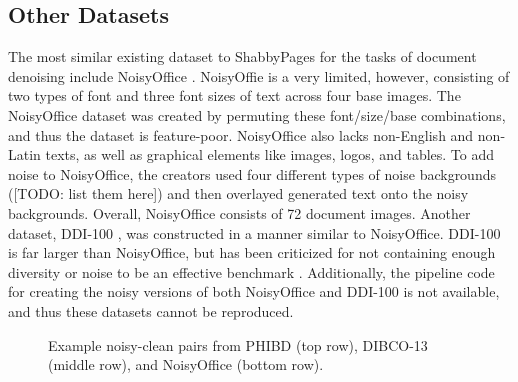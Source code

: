 \documentclass[runningheads]{llncs}
\begin{document}
\subsection{Other Datasets}
The most similar existing dataset to ShabbyPages for the tasks of document denoising include NoisyOffice \cite{ref_NoisyOfficeDatabase}.
NoisyOffie is a very limited, however, consisting of two types of font and three font sizes of text across four base images. The NoisyOffice dataset was created by permuting these font/size/base combinations, and thus the dataset is feature-poor.
NoisyOffice also lacks non-English and non-Latin texts, as well as graphical elements like images, logos, and tables.
To add noise to NoisyOffice, the creators used four different types of noise backgrounds ([TODO: list them here]) and then overlayed generated text onto the noisy backgrounds.
Overall, NoisyOffice consists of 72 document images.
Another dataset, DDI-100 \cite{ddi-100-2019}, was constructed in a manner similar to NoisyOffice.
DDI-100 is far larger than NoisyOffice, but has been criticized for not containing enough diversity or noise to be an effective benchmark \cite{detection-masking-2022}.
Additionally, the pipeline code for creating the noisy versions of both NoisyOffice and DDI-100 is not available, and thus these datasets cannot be reproduced.

\begin{figure}
    \centering{}
    \caption{Example noisy-clean pairs from PHIBD (top row), DIBCO-13 (middle row), and NoisyOffice (bottom row).}
    \label{fig:other-dataset-examples}
\end{figure}
\end{document}

